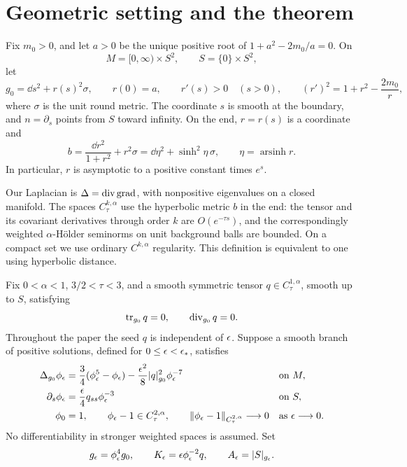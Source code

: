 \section{Geometric setting and the theorem}\label{sec:setting}

Fix $m_0>0$, and let $a>0$ be the unique positive root of
$1+a^2-2m_0/a=0$. On
\[
 M=[0,\infty)\times S^2,\qquad S=\{0\}\times S^2,
\]
let
\begin{equation}\label{eq:background}
 g_0=\dd s^2+r(s)^2\sigma,\qquad
 r(0)=a,\qquad r'(s)>0\quad(s>0),\qquad
 (r')^2=1+r^2-\frac{2m_0}{r},
\end{equation}
where $\sigma$ is the unit round metric. The coordinate $s$ is smooth
at the boundary, and $n=\partial_s$ points from $S$ toward infinity.
On the end, $r=r(s)$ is a coordinate and
\begin{equation}\label{eq:hyperbolic-reference}
 b=\frac{\dd r^2}{1+r^2}+r^2\sigma
   =\dd\eta^2+\sinh^2\eta\,\sigma,\qquad
 \eta=\operatorname{arsinh}r.
\end{equation}
In particular, $r$ is asymptotic to a positive constant times $e^s$.

Our Laplacian is $\Delta=\operatorname{div}\operatorname{grad}$, with nonpositive eigenvalues
on a closed manifold. The spaces $C^{k,\alpha}_\tau$ use the
hyperbolic metric $b$ in the end: the tensor and its covariant
derivatives through order $k$ are $O(e^{-\tau s})$, and the
correspondingly weighted $\alpha$-H\"older seminorms on unit
background balls are bounded. On a compact set we use ordinary
$C^{k,\alpha}$ regularity. This definition is equivalent to one
using hyperbolic distance.

Fix $0<\alpha<1$, $3/2<\tau<3$, and a smooth symmetric tensor
$q\in C^{1,\alpha}_\tau$, smooth up to $S$, satisfying
\begin{equation}\label{eq:tt-seed}
 \operatorname{tr}_{g_0}q=0,\qquad \operatorname{div}_{g_0}q=0.
\end{equation}
Throughout the paper the seed $q$ is independent of $\epsilon$.
Suppose a smooth branch of positive solutions, defined for
$0\leq\epsilon<\epsilon_*$, satisfies
\begin{align}
 \Delta_{g_0}\phi_\epsilon
 &=\frac34(\phi_\epsilon^5-\phi_\epsilon)
   -\frac{\epsilon^2}{8}|q|_{g_0}^2\phi_\epsilon^{-7}
       &&\text{on }M,\label{eq:conformal-equation}\\
 \partial_s\phi_\epsilon
 &=\frac{\epsilon}{4}q_{ss}\phi_\epsilon^{-3}
       &&\text{on }S,\label{eq:conformal-boundary}\\
 \phi_0&=1,\qquad
 \phi_\epsilon-1\in C^{2,\alpha}_\tau,\qquad
 \|\phi_\epsilon-1\|_{C^{2,\alpha}_\tau}\longrightarrow0
       &&\text{as }\epsilon\longrightarrow0.\label{eq:branch}
\end{align}
No differentiability in stronger weighted spaces is assumed.
Set
\begin{equation}\label{eq:actual-data}
 g_\epsilon=\phi_\epsilon^4g_0,\qquad
 K_\epsilon=\epsilon\phi_\epsilon^{-2}q,\qquad
 A_\epsilon=|S|_{g_\epsilon}.
\end{equation}

